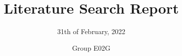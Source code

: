 \documentclass{layout/tudelft-report}
\begin{document}
\frontmatter

\title{Literature Search Report}
\subtitle{31th of February, 2022}
\author{Group E02G}
\subject{Design \& Construction: Compression Panel}

\makecover %

\tableofcontents

\mainmatter


%




\begin{appendices}  

\end{appendices}
\end{document}
